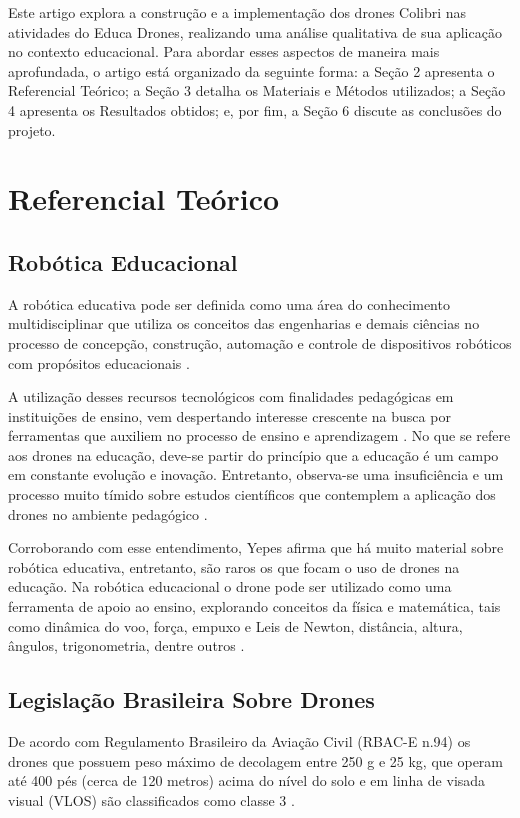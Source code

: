 \documentclass[conference]{IEEEtran}
\begin{document}
Este artigo explora a construção e a implementação dos drones Colibri nas atividades do Educa Drones, realizando uma análise qualitativa de sua aplicação no contexto educacional. Para abordar esses aspectos de maneira mais aprofundada, o artigo está organizado da seguinte forma: a Seção 2 apresenta o Referencial Teórico; a Seção 3 detalha os Materiais e Métodos utilizados; a Seção 4 apresenta os Resultados obtidos; e, por fim, a Seção 6 discute as conclusões do projeto.

\section{Referencial Teórico}

\subsection{Robótica Educacional}

A robótica educativa pode ser definida como uma área do conhecimento multidisciplinar que utiliza os conceitos das engenharias e demais ciências no processo de concepção, construção, automação e controle de dispositivos robóticos com propósitos educacionais \cite{b1}.

A utilização desses recursos tecnológicos com finalidades pedagógicas em instituições de ensino, vem despertando interesse crescente na busca por ferramentas que auxiliem no processo de ensino e aprendizagem \cite{b12}. No que se refere aos drones na educação, deve-se partir do princípio que a educação é um campo em constante evolução e inovação. Entretanto, observa-se uma insuficiência e um processo muito tímido sobre estudos científicos que contemplem a aplicação dos drones no ambiente pedagógico \cite{b9}.

Corroborando com esse entendimento, Yepes \cite{b11} afirma que há muito material sobre robótica educativa, entretanto, são raros os que focam o uso de drones na educação.  Na robótica educacional o drone pode ser utilizado como uma ferramenta de apoio ao ensino, explorando conceitos da física e matemática, tais como dinâmica do voo, força, empuxo e Leis de Newton, distância, altura, ângulos, trigonometria, dentre outros \cite{b11}.

\subsection{Legislação Brasileira Sobre Drones}

De acordo com Regulamento Brasileiro da Aviação Civil (RBAC-E n.94) os drones que possuem peso máximo de decolagem entre 250 g e 25 kg, que operam até 400 pés (cerca de 120 metros) acima do nível do solo e em linha de visada visual (VLOS) são classificados como classe 3 \cite{b2}.
\end{document}
